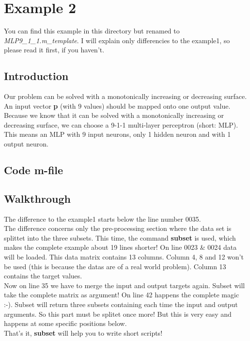 \section{Example 2}
You can find this example in this directory but renamed to \textit{MLP9\_1\_1.m\_template}.
I will explain only differencies to the example1, so please read it first, if you haven't.

\subsection{Introduction}
Our problem can be solved with a monotonically increasing or decreasing surface. An input vector \textbf{p}
(with 9 values) should be mapped onto one output value.
Because we know that it can be solved with a monotonically increasing or decreasing surface,
we can choose a 9-1-1 multi-layer perceptron (short: MLP).
This means an MLP with 9 input neurons, only 1 hidden neuron and with 1 output neuron.

\subsection{Code m-file}


\subsection{Walkthrough}
The difference to the example1 starts below the line number 0035.\\
The difference concerns only the pre-processing section where the data set is splittet into 
the three subsets. This time, the command \textbf{subset} is used, which makes the complete
example about 19 lines shorter!
On line 0023 \& 0024 data will be loaded. This data matrix contains 13 columns.
Column 4, 8 and 12 won't be used (this is because the datas are of a real world problem).
Column 13 contains the target values.\\

Now on line 35 we have to merge the input and output targets again. Subset will take the complete
matrix as argument! On line 42 happens the complete magic :-). Subset will return three 
subsets containing each time the input and output arguments. So this part must be splitet once more!
But this is very easy and happens at some specific positions below.\\

That's it, \textbf{subset} will help you to write short scripts!





